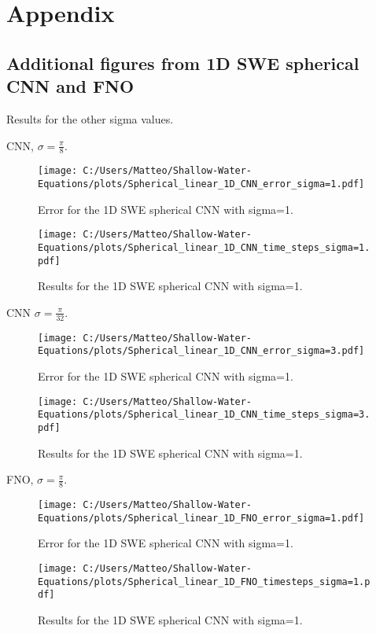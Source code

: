 \chapter{Appendix}


\section{Additional figures from 1D SWE spherical CNN and FNO}
Results for the other sigma values.

CNN, $\sigma = \frac{\pi}{8}$.
\begin{figure}[H]
    \centering
    \texttt{[image: C:/Users/Matteo/Shallow-Water-Equations/plots/Spherical\_linear\_1D\_CNN\_error\_sigma=1.pdf]}
    \caption{Error for the 1D SWE spherical CNN with sigma=1.}
\end{figure}

\begin{figure}[H]
    \centering
    \texttt{[image: C:/Users/Matteo/Shallow-Water-Equations/plots/Spherical\_linear\_1D\_CNN\_time\_steps\_sigma=1.pdf]}
    \caption{Results for the 1D SWE spherical CNN with sigma=1.}
\end{figure}

CNN $\sigma = \frac{\pi}{32}$.
\begin{figure}[H]
    \centering
    \texttt{[image: C:/Users/Matteo/Shallow-Water-Equations/plots/Spherical\_linear\_1D\_CNN\_error\_sigma=3.pdf]}
    \caption{Error for the 1D SWE spherical CNN with sigma=1.}
\end{figure}

\begin{figure}[H]
    \centering
    \texttt{[image: C:/Users/Matteo/Shallow-Water-Equations/plots/Spherical\_linear\_1D\_CNN\_time\_steps\_sigma=3.pdf]}
    \caption{Results for the 1D SWE spherical CNN with sigma=1.}
\end{figure}

FNO, $\sigma = \frac{\pi}{8}$.
\begin{figure}[H]
    \centering
    \texttt{[image: C:/Users/Matteo/Shallow-Water-Equations/plots/Spherical\_linear\_1D\_FNO\_error\_sigma=1.pdf]}
    \caption{Error for the 1D SWE spherical CNN with sigma=1.}
\end{figure}

\begin{figure}[H]
    \centering
    \texttt{[image: C:/Users/Matteo/Shallow-Water-Equations/plots/Spherical\_linear\_1D\_FNO\_timesteps\_sigma=1.pdf]}
    \caption{Results for the 1D SWE spherical CNN with sigma=1.}
\end{figure}

